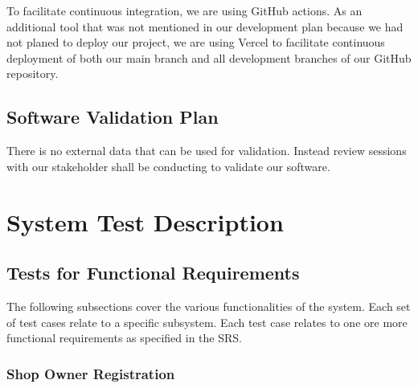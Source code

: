 \documentclass[12pt, titlepage]{article}
\begin{document}
To facilitate continuous integration, we are using GitHub actions. As an additional tool that was not mentioned in our development plan because we had not planed to deploy our project, we are using Vercel to facilitate continuous deployment of both our main branch and all development branches of our GitHub repository.

\subsection{Software Validation Plan}

There is no external data that can be used for validation. Instead review sessions with our stakeholder shall be conducting to validate our software.




\section{System Test Description}
	
\subsection{Tests for Functional Requirements}



The following subsections cover the various functionalities of the system. Each set of test cases relate to a specific subsystem. Each test case relates to one ore more functional requirements as specified in the SRS.

\subsubsection{Shop Owner Registration}
\end{document}
